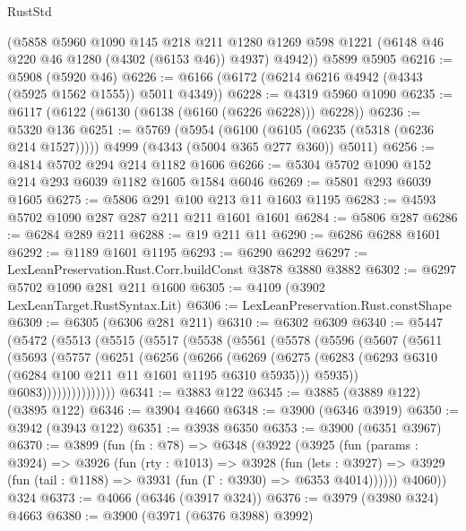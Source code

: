 \begin{lexlean}{RustStd}
\begin{coremodule}
      (@5858
        @5960
        @1090
        @145
        @218
        @211
        @1280
        @1269
        @598
        @1221
        (@6148 @46 @220 @46 @1280 (@4302 (@6153 @46)) @4937)
        @4942))
    @5899
    @5905
@6216 := @5908 (@5920 @46)
@6226 := @6166 (@6172 (@6214 @6216 @4942 (@4343 (@5925 @1562 @1555)) @5011 @4349))
@6228 := @4319 @5960 @1090
@6235 := @6117 (@6122 (@6130 (@6138 (@6160 (@6226 @6228))) @6228))
@6236 := @5320 @136
@6251 := @5769
    (@5954
      (@6100 (@6105 (@6235 (@5318 (@6236 @214 @1527)))))
      @4999
      (@4343 (@5004 @365 @277 @360))
      @5011)
@6256 := @4814 @5702 @294 @214 @1182 @1606
@6266 := @5304 @5702 @1090 @152 @214 @293 @6039 @1182 @1605 @1584 @6046
@6269 := @5801 @293 @6039 @1605
@6275 := @5806 @291 @100 @213 @11 @1603 @1195
@6283 := @4593 @5702 @1090 @287 @287 @211 @211 @1601 @1601
@6284 := @5806 @287
@6286 := @6284 @289 @211
@6288 := @19 @211 @11
@6290 := @6286 @6288 @1601
@6292 := @1189 @1601 @1195
@6293 := @6290 @6292
@6297 := LexLeanPreservation.Rust.Corr.buildConst @3878 @3880 @3882
@6302 := @6297 @5702 @1090 @281 @211 @1600
@6305 := @4109 (@3902 LexLeanTarget.RustSyntax.Lit)
@6306 := LexLeanPreservation.Rust.constShape
@6309 := @6305 (@6306 @281 @211)
@6310 := @6302 @6309
@6340 := @5447
    (@5472
      (@5513
        (@5515
          (@5517
            (@5538
              (@5561
                (@5578
                  (@5596
                    (@5607
                      (@5611
                        (@5693
                          (@5757
                            (@6251
                              (@6256
                                (@6266
                                  (@6269
                                    (@6275
                                      (@6283
                                        (@6293 @6310 (@6284 @100 @211 @11 @1601 @1195 @6310 @5935)))
                                      @5935))
                                  @6083)))))))))))))))
@6341 := @3883 @122
@6345 := @3885 (@3889 @122) (@3895 @122)
@6346 := @3904 @4660
@6348 := @3900 (@6346 @3919)
@6350 := @3942 (@3943 @122)
@6351 := @3938 @6350
@6353 := @3900 (@6351 @3967)
@6370 := @3899
    (fun (fn : @78) =>
    @6348
      (@3922
        (@3925
          (fun (params : @3924) =>
          @3926
            (fun (rty : @1013) =>
            @3928
              (fun (lets : @3927) =>
              @3929 (fun (tail : @1188) => @3931 (fun (Γ : @3930) => @6353 @4014))))))
        @4060))
    @324
@6373 := @4066 (@6346 (@3917 @324))
@6376 := @3979 (@3980 @324) @4663
@6380 := @3900 (@3971 (@6376 @3988) @3992)

\end{coremodule}
\end{lexlean}
